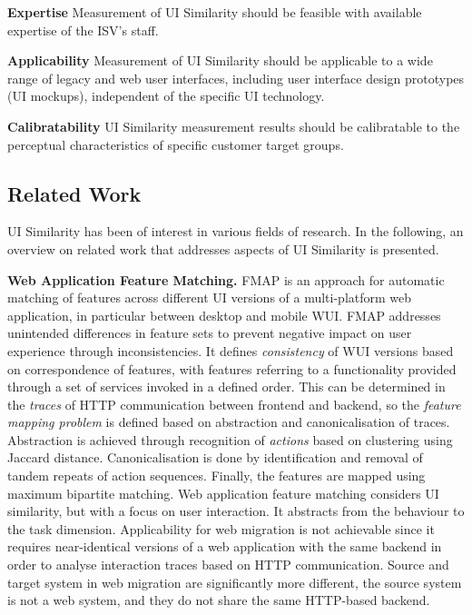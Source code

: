 \textbf{Expertise} Measurement of UI Similarity should be feasible with available expertise of the ISV's staff.

\textbf{Applicability} Measurement of UI Similarity should be applicable to a wide range of legacy and web user interfaces, including user interface design prototypes (UI mockups), independent of the specific UI technology.

\textbf{Calibratability} UI Similarity measurement results should be calibratable to the perceptual characteristics of specific customer target groups.

\hypertarget{sec:ci.related-work}{%
\subsection{Related Work}\label{sec:ci.related-work}}

UI Similarity has been of interest in various fields of research.
In the following, an overview on related work that addresses aspects of UI Similarity is presented.

\textbf{Web Application Feature Matching.} FMAP \autocite{RoyChoudhary2014Matching} is an approach for automatic matching of features across different UI versions of a multi-platform web application, in particular between desktop and mobile WUI.
FMAP addresses unintended differences in feature sets to prevent negative impact on user experience through inconsistencies.
It defines \emph{consistency} of WUI versions based on correspondence of features, with features referring to a functionality provided through a set of services invoked in a defined order.
This can be determined in the \emph{traces} of HTTP communication between frontend and backend, so the \emph{feature mapping problem} is defined based on abstraction and canonicalisation of traces.
Abstraction is achieved through recognition of \emph{actions} based on clustering using Jaccard distance.
Canonicalisation is done by identification and removal of tandem repeats of action sequences.
Finally, the features are mapped using maximum bipartite matching.
Web application feature matching considers UI similarity, but with a focus on user interaction.
It abstracts from the behaviour to the task dimension.
Applicability for web migration is not achievable since it requires near-identical versions of a web application with the same backend in order to analyse interaction traces based on HTTP communication.
Source and target system in web migration are significantly more different, the source system is not a web system, and they do not share the same HTTP-based backend.


